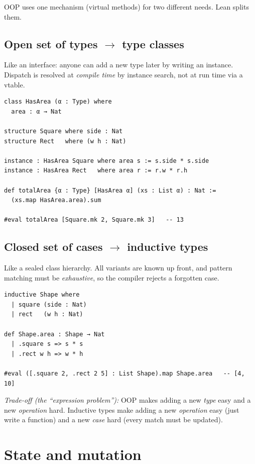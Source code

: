 \documentclass[11pt,a4paper]{article}
\begin{document}
OOP uses one mechanism (virtual methods) for two different needs. Lean
splits them.

\subsection*{Open set of types $\to$ type classes}

Like an interface: anyone can add a new type later by writing an instance.
Dispatch is resolved at \emph{compile time} by instance search, not at run
time via a vtable.

\begin{lstlisting}[language=Lean]
class HasArea (α : Type) where
  area : α → Nat

structure Square where side : Nat
structure Rect   where (w h : Nat)

instance : HasArea Square where area s := s.side * s.side
instance : HasArea Rect   where area r := r.w * r.h

def totalArea {α : Type} [HasArea α] (xs : List α) : Nat :=
  (xs.map HasArea.area).sum

#eval totalArea [Square.mk 2, Square.mk 3]   -- 13
\end{lstlisting}

\subsection*{Closed set of cases $\to$ inductive types}

Like a sealed class hierarchy. All variants are known up front, and
pattern matching must be \emph{exhaustive}, so the compiler rejects a
forgotten case.

\begin{lstlisting}[language=Lean]
inductive Shape where
  | square (side : Nat)
  | rect   (w h : Nat)

def Shape.area : Shape → Nat
  | .square s => s * s
  | .rect w h => w * h

#eval ([.square 2, .rect 2 5] : List Shape).map Shape.area   -- [4, 10]
\end{lstlisting}

\textit{Trade-off (the ``expression problem''):} OOP makes adding a new
\emph{type} easy and a new \emph{operation} hard. Inductive types make
adding a new \emph{operation} easy (just write a function) and a new
\emph{case} hard (every match must be updated).

\section{State and mutation}
\end{document}

